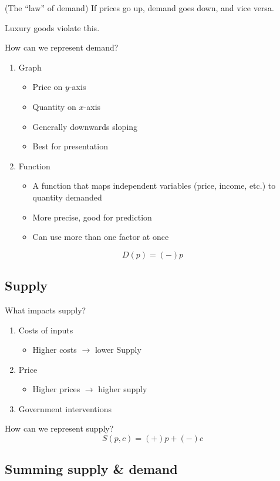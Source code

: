 \begin{theorem}
  (The ``law'' of demand) If prices go up, demand goes down, and vice versa.

  Luxury goods violate this.
\end{theorem}

How can we represent demand?
\begin{enumerate}
  \item Graph\begin{itemize}
    \item Price on $y$-axis
    \item Quantity on $x$-axis
    \item Generally downwards sloping
    \item Best for presentation
  \end{itemize}
  \item Function\begin{itemize}
    \item A function that maps independent variables (price, income, etc.) to quantity demanded
    \item More precise, good for prediction
    \item Can use more than one factor at once
  \end{itemize}
\end{enumerate}
\[D(p)=(-)p\]

\subsection{Supply}

What impacts supply?
\begin{enumerate}
  \item Costs of inputs\begin{itemize}
    \item Higher costs $\rightarrow$ lower Supply
  \end{itemize}
  \item Price\begin{itemize}
    \item Higher prices $\rightarrow$ higher supply
  \end{itemize}
  \item Government interventions
\end{enumerate}

How can we represent supply? \[S(p,c)=(+)p+(-)c\]

\subsection{Summing supply \& demand}

